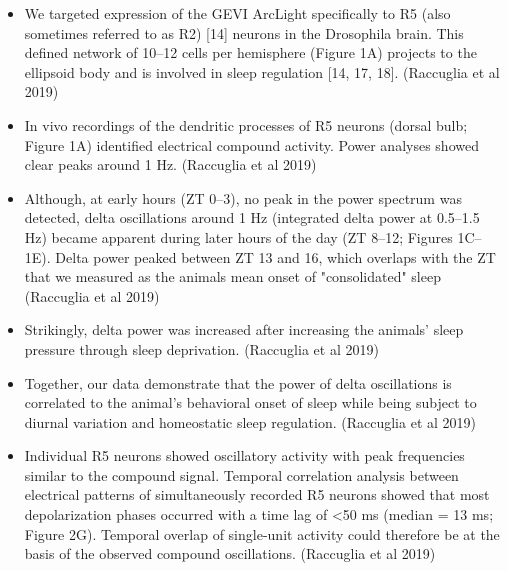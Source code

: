 \documentclass[11pt]{article}
\begin{document}
\begin{itemize}
    \item We targeted expression of the GEVI ArcLight specifically to R5 (also sometimes referred to as R2) [14] neurons in the Drosophila brain. This defined network of 10–12 cells per hemisphere (Figure 1A) projects to the ellipsoid body and is involved in sleep regulation [14, 17, 18].
    \cite{raccugliaNetworkSpecificSynchronizationElectrical2019} (Raccuglia et al 2019)

    \item In vivo recordings of the dendritic processes of R5 neurons (dorsal bulb; Figure 1A) identified electrical compound activity. Power analyses showed clear peaks around 1 Hz.
    \cite{raccugliaNetworkSpecificSynchronizationElectrical2019} (Raccuglia et al 2019)

    \item Although, at early hours (ZT 0–3), no peak in the power spectrum was detected, delta oscillations around 1 Hz (integrated delta power at 0.5–1.5 Hz) became apparent during later hours of the day (ZT 8–12; Figures 1C–1E). Delta power peaked between ZT 13 and 16, which overlaps with the ZT that we measured as the animals mean onset of "consolidated" sleep
    \cite{raccugliaNetworkSpecificSynchronizationElectrical2019} (Raccuglia et al 2019)

    \item Strikingly, delta power was increased after increasing the animals’ sleep pressure through sleep deprivation.
    \cite{raccugliaNetworkSpecificSynchronizationElectrical2019} (Raccuglia et al 2019)

    \item Together, our data demonstrate that the power of delta oscillations is correlated to the animal’s behavioral onset of sleep while being subject to diurnal variation and homeostatic sleep regulation.
    \cite{raccugliaNetworkSpecificSynchronizationElectrical2019} (Raccuglia et al 2019)

    \item Individual R5 neurons showed oscillatory activity with peak frequencies similar to the compound signal.
    Temporal correlation analysis between electrical patterns of simultaneously recorded R5 neurons showed that most depolarization phases occurred with a time lag of <50 ms (median = 13 ms; Figure 2G). Temporal overlap of single-unit activity could therefore be at the basis of the observed compound oscillations.
    \cite{raccugliaNetworkSpecificSynchronizationElectrical2019} (Raccuglia et al 2019)


\end{itemize}
\end{document}
